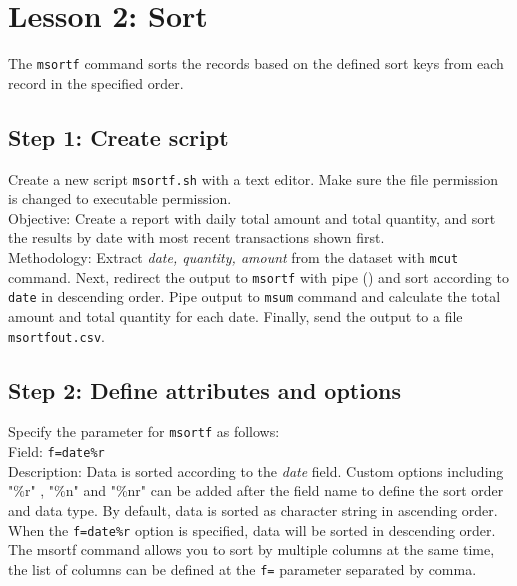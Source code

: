 


\section{Lesson 2: Sort}

The \verb|msortf| command sorts the records based on the defined sort keys from each record in the specified order.

\subsection{Step 1: Create script}

Create a new script \verb|msortf.sh| with a text editor. Make sure the file permission is changed to executable permission. \\

Objective: Create a report with daily total amount and total quantity, and sort the results by date with most recent transactions shown first.  \\

Methodology: Extract \emph{date, quantity, amount} from the dataset with \verb|mcut| command. Next, redirect the output to \verb|msortf| with pipe (\textbar) and sort according to \verb|date| in descending order. Pipe output to \verb|msum| command and calculate the total amount and total quantity for each date. Finally, send the output to a file \verb|msortfout.csv|.

 \subsection{Step 2: Define attributes and options }

{\setlength{\parindent}{0cm}

Specify the parameter for \verb|msortf| as follows: \\

Field: 		\verb|f=date%r| \\
Description: 	Data is sorted according to the \emph{date} field. Custom options including "\%r" , "\%n" and "\%nr"  can be added after the field name to define the sort order and data type. By default, data is sorted as character string in ascending order. When the \verb|f=date%r| option is specified, data will be sorted in descending order. The msortf command allows you to sort by multiple columns at the same time,  the list of columns can be defined at the \verb|f=| parameter separated by comma. } \\

